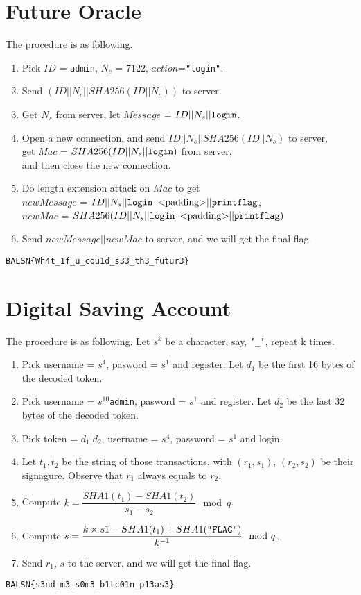 \documentclass[12pt,a4paper]{article}
\begin{document}
\section{Future Oracle}
The procedure is as following.
\begin{enumerate}[label=\arabic*., topsep=0pt,itemsep=0pt,partopsep=1ex,parsep=1ex]
    \item Pick $ID$ = \texttt{admin}, $N_c$ = $7122$, $action$=\texttt{"login"}.
    \item Send $(ID||N_c||SHA256(ID||N_c))$ to server.
    \item Get $N_s$ from server, let $Message$ = $ID||N_s||\text{\texttt{login}}$.
    \item Open a new connection, and send $ID||N_s||SHA256(ID||N_s)$ to server,\\
       get $Mac$ = $SHA256(ID||N_s||\text{\texttt{login}})$ from server,\\
       and then close the new connection.
    \item Do length extension attack on $Mac$ to get\\
        $newMessage$ = $ID||N_s||\text{\texttt{login }<padding>}||\text{\texttt{printflag}}$,\\
        $newMac$ = $SHA256(ID||N_s||\text{\texttt{login }<padding>}||\text{\texttt{printflag}})$
    \item Send $newMessage||newMac$ to server, and we will get the final flag.
\end{enumerate}
\texttt{BALSN\{Wh4t\_1f\_u\_cou1d\_s33\_th3\_futur3\}}
\section{Digital Saving Account}
The procedure is as following. Let $s^k$ be a character, say, \texttt{'\_'}, repeat k times.
\begin{enumerate}[label=\arabic*., topsep=0pt,itemsep=0pt,partopsep=1ex,parsep=1ex]
    \item Pick username = $s^4$, pasword = $s^1$ and register. Let $d_1$ be the first 16 bytes of the decoded token.
    \item Pick username = $s^{10}$\texttt{admin}, pasword = $s^1$ and register. Let $d_2$ be the last 32 bytes of the decoded token.
    \item Pick token = $d_1|d_2$, username = $s^4$, password = $s^1$ and login.
    \item Let $t_1, t_2$ be the string of those transactions, with $(r_1, s_1)$, $(r_2, s_2)$ be their signagure. Observe that $r_1$ always equals to $r_2$.
    \item Compute $k=\dfrac{SHA1(t_1)-SHA1(t_2)}{s_1-s_2} \mod q$.
    \item Compute $s=\dfrac{k\times s1-SHA1(t_1)+SHA1(\text{\texttt{"FLAG"}})}{k^{-1}} \mod q$.
    \item Send $r_1$, $s$ to the server, and we will get the final flag.
\end{enumerate}
\texttt{BALSN\{s3nd\_m3\_s0m3\_b1tc01n\_p13as3\}}

        
\end{document}
